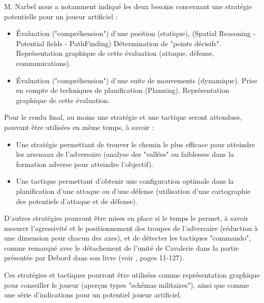 \documentclass[a4paper]{report}
\begin{document}
M. Narbel nous a notamment indiqué les deux besoins concernant une stratégie potentielle pour un joueur artificiel : %
\newline

\begin{itemize}

\item Évaluation ("compréhension") d'une position (statique),
   (Spatial Reasoning\cite{spatial-reasoning} - Potential fields - PathFinding)
   Détermination de "points décisifs".  Représentation graphique de
   cette évaluation (attaque, défense, communications).

\item Évaluation ("compréhension") d'une suite de mouvements (dynamique).
   Prise en compte de techniques de planification (Planning).
   Représentation graphique de cette évaluation.

\end{itemize}

Pour le rendu final, au moins une stratégie et une tactique seront attendues, pouvant être utilisées en même temps, à savoir :
\begin{itemize}
\item Une stratégie permettant de trouver le chemin le plus efficace pour atteindre les arsenaux de l'adversaire (analyse des "vallées" ou faiblesses dans la formation adverse pour atteindre l'objectif).
\item Une tactique permettant d'obtenir une configuration optimale dans la planification d'une attaque ou d'une défense (utilisation d'une cartographie des potentiels d'attaque et de défense).
\end{itemize}

D'autres stratégies pourront être mises en place si le temps le permet, à savoir mesurer l'agressivité et le positionnement des troupes de l'adversaire (réduction à une dimension pour chacun des axes), et de détecter les tactiques "commando", comme remarqué avec le détachement de l'unité de Cavalerie dans la partie présentée par Debord dans son livre (voir \cite{jdg}, pages 11-127).

Ces stratégies et tactiques pourront être utilisées comme représentation graphique pour conseiller le joueur (aperçus types "schémas militaires"), ainsi que comme une série d'indications pour un potentiel joueur artificiel.
   
\end{document}
